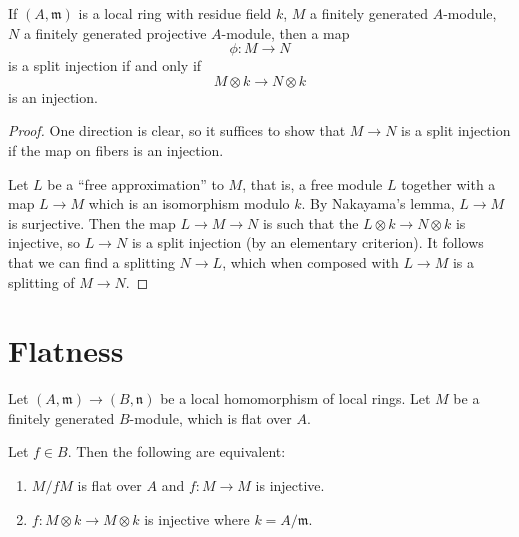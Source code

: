 \begin{lemma} 
If $(A, \mathfrak{m})$ is a local ring with residue field $k$, $M$ a finitely
generated $A$-module, $N$ a finitely
generated projective $A$-module, then a map
\[ \phi: M \to N  \]
is a split injection if and only if
\[ M \otimes k \to N \otimes k  \]
is an injection.
\end{lemma} 
\begin{proof} 
One direction is clear, so it suffices to show that $M \to N$ is a split
injection if the map on fibers is an injection.


Let $L$ be a ``free approximation'' to $M$, that is, a free module $L$ together
with a map $L \to M$ which is an isomorphism modulo $k$. By Nakayama's lemma,
$L \to M$ is surjective.
Then the map
$L \to M \to N$ is such that the $L \otimes k \to N \otimes k$ is injective, so
$L \to N$ is a split injection (by an elementary criterion).
It follows that we can find a splitting $N \to L$, which when composed with $L
\to M$ is a splitting of $M \to N$.
\end{proof}
\section{Flatness}

\begin{lemma} 
Let $(A, \mathfrak{m}) \to (B, \mathfrak{n})$ be a local homomorphism of local
rings.
Let $M$ be a finitely generated $B$-module, which is flat over $A$. 

Let $f \in B$. Then the following are equivalent:
\begin{enumerate}
\item $M/fM$ is flat over $A$ and $f: M \to M$ is injective.
\item $f: M \otimes k \to M \otimes k$ is injective where $k = A/\mathfrak{m}$.
\end{enumerate}
\end{lemma} 

